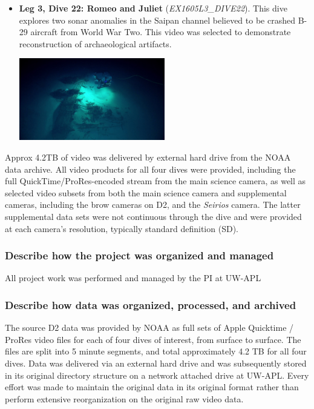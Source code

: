 \documentclass[letterpaper,12pt]{article}
\begin{document}
\begin{itemize}
    \item \textbf{Leg 3, Dive 22: Romeo and Juliet} (\textit{EX1605L3\_DIVE22}).  This dive explores two sonar anomalies in the Saipan channel believed to be crashed B-29 aircraft from World War Two.  This video was selected to demonstrate reconstruction of archaeological artifacts.
    
    \includegraphics[width=0.5\textwidth]{images/EX1605L3_DIVE22_highlight.jpg}
    
\end{itemize}

Approx 4.2TB of video was delivered by external hard drive from the NOAA data archive.  All video products for all four dives were provided, including the full QuickTime/ProRes-encoded stream from the main science camera, as well as selected video subsets from both the main science camera and supplemental cameras, including the brow cameras on D2, and the \textit{Seirios} camera.   The latter supplemental data sets were not continuous through the dive and were provided at each camera's resolution, typically standard definition (SD).  


\subsubsection*{Describe how the project was organized and managed}

All project work was performed and managed by the PI at UW-APL

\subsubsection*{Describe how data was organized, processed, and archived}

The source D2 data was provided by NOAA as full sets of Apple Quicktime / ProRes video files for each of four dives of interest, from surface to surface.   The files are split into 5 minute segments, and total approximately 4.2 TB for all four dives.   Data was delivered via an external hard drive and was subsequently stored in its original directory structure on a network attached drive at UW-APL.  Every effort was made to maintain the original data in its original format rather than perform extensive reorganization on the original raw video data.
\end{document}
